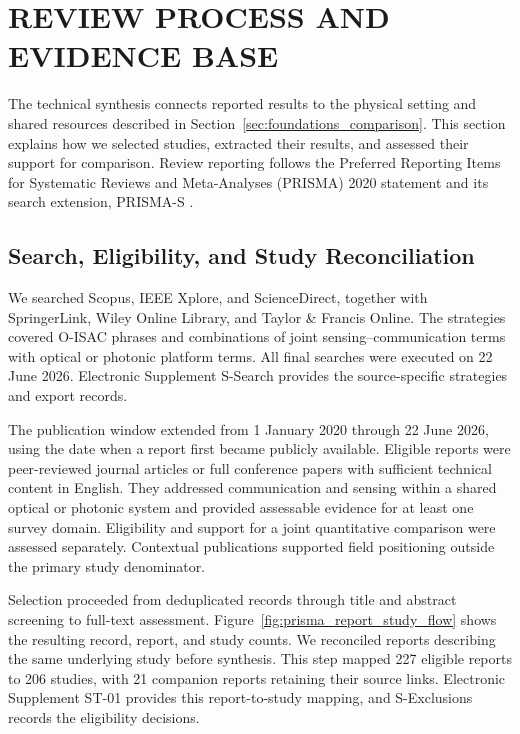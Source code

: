 \section{REVIEW PROCESS AND EVIDENCE BASE}
\label{sec:review_methods}
\label{sec:corpus_appraisal_results}

The technical synthesis connects reported results to the physical setting and
shared resources described in Section~\ref{sec:foundations_comparison}.
This section explains how we selected studies, extracted their results, and
assessed their support for comparison. Review reporting follows the Preferred
Reporting Items for Systematic Reviews and Meta-Analyses (PRISMA) 2020
statement and its search extension, PRISMA-S \cite{PRISMA2020,PRISMAS2021}.

\subsection{Search, Eligibility, and Study Reconciliation}
\label{sec:study_selection_reconciliation}

We searched Scopus, IEEE Xplore, and ScienceDirect, together with
SpringerLink, Wiley Online Library, and Taylor \& Francis Online.
The strategies covered O-ISAC phrases and combinations of joint
sensing--communication terms with optical or photonic platform terms.
All final searches were executed on 22 June 2026. Electronic Supplement
S-Search provides the source-specific strategies and export records.

The publication window extended from 1 January 2020 through 22 June 2026,
using the date when a report first became publicly available.
Eligible reports were peer-reviewed journal articles or full conference papers
with sufficient technical content in English. They addressed communication
and sensing within a shared optical or photonic system and provided assessable
evidence for at least one survey domain. Eligibility and support for a joint
quantitative comparison were assessed separately. Contextual publications
supported field positioning outside the primary study denominator.

Selection proceeded from deduplicated records through title and abstract
screening to full-text assessment. Figure~\ref{fig:prisma_report_study_flow}
shows the resulting record, report, and study counts. We reconciled reports
describing the same underlying study before synthesis. This step mapped
227 eligible reports to 206 studies, with 21 companion reports retaining
their source links. Electronic Supplement ST-01 provides this report-to-study
mapping, and S-Exclusions records the eligibility decisions.

